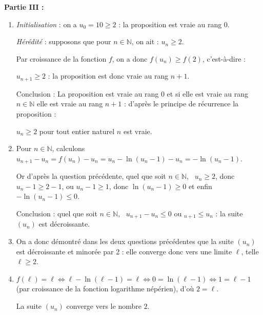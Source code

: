 \documentclass[10pt]{article}
\providecommand{\N}{\mathbb{N}}
\begin{document}
\bigskip

\textbf{Partie III :}

\medskip

\begin{enumerate}
\item 
\emph{Initialisation} : on a $u_0 = 10 \geqslant 2$
 : la proposition est vraie au rang $0$.

\emph{Hérédité} : supposons que pour $n \in \N$, on ait : $u_n \geqslant 2$.

Par croissance de la fonction $f$, on a donc $f\left(u_n\right) \geqslant f(2)$, c'est-à-dire :

$u_{n+1} \geqslant 2$ : la proposition est donc vraie au rang $n + 1$.

Conclusion : La proposition est vraie au rang $0$ et si elle est vraie au rang $n \in \N$ elle est vraie au rang $n + 1$ : d'après le principe de récurrence la proposition :

\og $u_n \geqslant  2$ pour tout entier naturel $n$\fg{} est vraie.
 \item 
Pour $n \in \N$, calculons $u_{n+1} - u_n  = f\left(u_n \right) - u_n = u_n - \ln \left(u_n - 1 \right) - u_n = - \ln \left(u_n - 1 \right)$.

Or d'après la question précédente, quel que soit $n \in \N$, \, $u_n \geqslant 2$, donc $u_n - 1 \geqslant 2 - 1$, ou $u_n - 1 \geqslant 1$, donc $\ln \left(u_n - 1 \right) \geqslant 0$ et enfin $- \ln \left(u_n - 1 \right) \leqslant 0$.

Conclusion : quel que soit $n \in \N$, \, $u_{n+1} - u_n \leqslant 0$ ou $_{n+1} \leqslant u_n$ : la suite $\left(u_n\right)$ est décroissante.
\item 
On a donc démontré dans les deux questions précédentes que la suite $\left(u_n\right)$ est décroissante et minorée par 2 : elle converge donc vers une limite $\ell$, telle $\ell \geqslant 2$.
\item 
$f(\ell) = \ell \iff \ell - \ln (\ell - 1) = \ell \iff 0 = \ln (\ell- 1) \iff 1 = \ell - 1$ (par croissance de la fonction logarithme népérien), d'où $2 = \ell$.

La suite $\left(u_n\right)$ converge vers le nombre $2$.
\end{enumerate}
\end{document}
